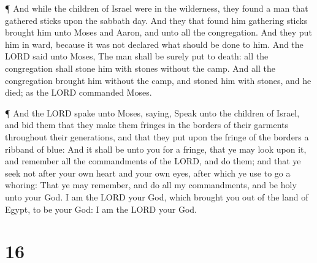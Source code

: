  ¶ And while the children of Israel were in the wilderness,
they found a man that gathered sticks upon the sabbath day.
 And they that found him gathering sticks brought him unto
Moses and Aaron, and unto all the congregation.  And they
put him in ward, because it was not declared what should be done to him.
 And the LORD said unto Moses, The man shall be surely put
to death: all the congregation shall stone him with stones without the
camp.  And all the congregation brought him without the
camp, and stoned him with stones, and he died; as the LORD commanded
Moses.

 ¶ And the LORD spake unto Moses, saying, 
Speak unto the children of Israel, and bid them that they make them
fringes in the borders of their garments throughout their generations,
and that they put upon the fringe of the borders a ribband of blue:
 And it shall be unto you for a fringe, that ye may look
upon it, and remember all the commandments of the LORD, and do them; and
that ye seek not after your own heart and your own eyes, after which ye
use to go a whoring:  That ye may remember, and do all my
commandments, and be holy unto your God.  I am the LORD
your God, which brought you out of the land of Egypt, to be your God: I
am the LORD your God.

\hypertarget{section-15}{%
\section{16}\label{section-15}}

